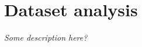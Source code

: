 
\newcommand{\twopic}[3]{
    \begin{figure}[h!]
        \begin{subfigure}[h!]{0.5\textwidth}
            \texttt{[image: \#1]}
        \end{subfigure}
        ~
        \begin{subfigure}[h!]{0.5\textwidth}
            \texttt{[image: \#2]}
        \end{subfigure}
        \caption{#3}
    \end{figure}
}


\section{Dataset analysis}\label{sec:results:data}

\textit{Some description here?}





